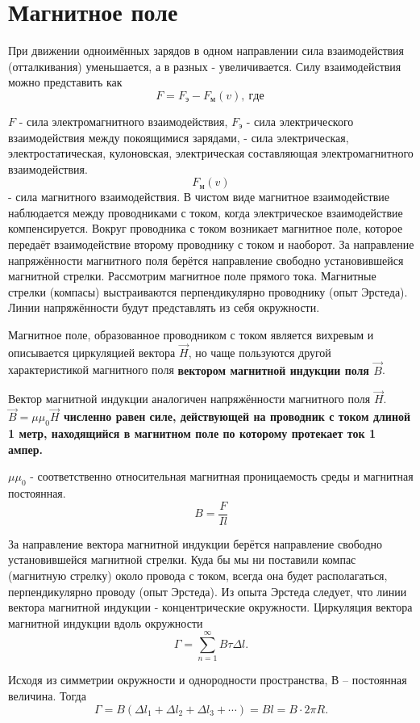 \documentclass[a6paper, 11pt]{diss_4}
\renewcommand{\'}{\,'}
\begin{document}
\section{Магнитное поле}
При движении одноимённых зарядов в одном направлении сила взаимодействия (отталкивания) уменьшается, а в разных - увеличивается. Силу взаимодействия можно представить как
\[
F=F_э-F_м(v),\ где\
\]

$F$ - сила электромагнитного взаимодействия, $F_э$ - сила электрического взаимодействия между покоящимися зарядами, - сила электрическая, электростатическая, кулоновская, электрическая составляющая электромагнитного взаимодействия. $$F_м(v)$$ - сила магнитного взаимодействия. В чистом виде магнитное взаимодействие наблюдается между проводниками с током, когда электрическое взаимодействие компенсируется. Вокруг проводника с током возникает магнитное поле, которое передаёт взаимодействие второму проводнику с током и наоборот. За направление напряжённости магнитного поля берётся направление свободно установившейся магнитной стрелки.  Рассмотрим магнитное поле прямого тока.   Магнитные стрелки (компасы) выстраиваются перпендикулярно проводнику (опыт Эрстеда). Линии напряжённости будут представлять из себя окружности.

Магнитное поле, образованное проводником с током  является вихревым и описывается циркуляцией вектора  $\vec{H}$, но чаще пользуются другой характеристикой магнитного поля \textbf{вектором магнитной индукции поля $\vec{B}$}.

Вектор магнитной индукции аналогичен напряжённости магнитного поля $\vec{H}$. \textbf{$\vec{B}=\mu\mu_0\vec{H}$ численно равен силе, действующей на проводник с током длиной 1 метр, находящийся в магнитном поле по которому протекает ток 1 ампер.}

$\mu\mu_0$ - соответственно относительная магнитная проницаемость среды и магнитная постоянная.
\[
B=\frac{F}{Il}
\]

За направление вектора магнитной индукции берётся направление свободно установившейся магнитной стрелки. Куда бы мы ни поставили компас (магнитную стрелку) около провода с током, всегда она будет располагаться, перпендикулярно проводу (опыт Эрстеда). Из опыта Эрстеда следует, что линии вектора магнитной индукции - концентрические окружности. Циркуляция вектора магнитной индукции вдоль окружности
\[
\Gamma=\sum\limits_{n=1}^{\infty}B\tau\Delta l.
\]

Исходя из симметрии окружности и однородности пространства, В -- постоянная величина. Тогда
\[
\Gamma=B(\Delta l_1+\Delta l_2+\Delta l_3+\cdots)=Bl=B\cdot 2\pi R.
\]
\end{document}
